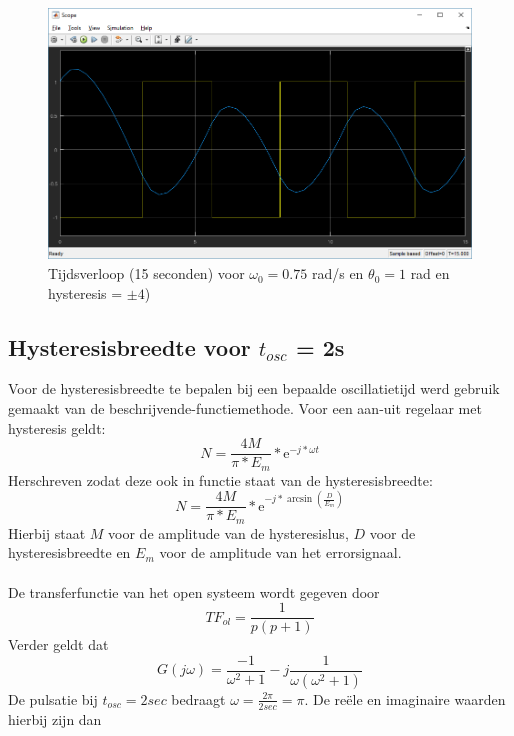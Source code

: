 \documentclass[12pt]{article}
\begin{document}
\begin{figure}[]
	\centering
	\includegraphics[width=\textwidth, keepaspectratio]{output2.png}
	\caption{Tijdsverloop (15 seconden) voor $\omega_0 = 0.75$ rad/s en $\theta_0 = 1$ rad en hysteresis = $\pm 4$)}
	\label{output2}
\end{figure}
\clearpage
\subsection{Hysteresisbreedte voor $t_{osc}$ = 2s}
Voor de hysteresisbreedte te bepalen bij een bepaalde oscillatietijd werd gebruik gemaakt van de beschrijvende-functiemethode. Voor een aan-uit regelaar met hysteresis geldt:
\begin{equation}
	N = \frac{4M}{\pi * E_m} * \mathrm{e}^{-j*\omega t}
\end{equation}
Herschreven zodat deze ook in functie staat van de hysteresisbreedte:
\begin{equation}
	N = \frac{4M}{\pi * E_m} * \mathrm{e}^{-j*\arcsin(\frac{D}{E_m})}
	\label{hbreedte}
\end{equation} 
Hierbij staat $M$ voor de amplitude van de hysteresislus, $D$ voor de hysteresisbreedte en $E_m$ voor de amplitude van het errorsignaal. \\ \\
De transferfunctie van het open systeem wordt gegeven door
\begin{equation}
	TF_{ol} = \frac{1}{p(p+1)}
\end{equation}
Verder geldt dat
\begin{equation}
	G(j\omega) = \frac{-1}{\omega^2+1} -j\frac{1}{\omega(\omega^2+1)}
	\label{gjomega}
\end{equation}
De pulsatie bij $t_{osc} = 2sec$ bedraagt $\omega = \frac{2\pi}{2sec} = \pi$. De reële en imaginaire waarden hierbij zijn dan
\end{document}
